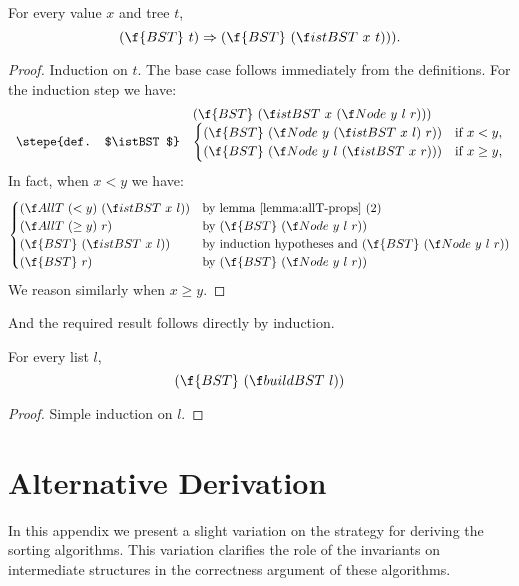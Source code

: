 \documentclass[a4paper,11pt]{llncs}
\begin{document}
\begin{proposition}
For every value $x$ and tree $t$,
\[ (\f{BST}\ t) \Rightarrow (\f{BST}\ (\istBST\ x\ t))). \]
\end{proposition}
\begin{proof}
  Induction on $t$. The base case follows immediately from the
  definitions. For the induction step we have:
\[
  \begin{array}{rl}
    & (\f{BST}\ (\istBST\ x\ (\Node\ y\ l\ r))) \\
    \stepe{def. $\istBST$}
    & 
    \begin{cases}
      (\f{BST}\ (\Node\ y\ (\istBST\ x\ l)\ r))
      & \text{if $x<y$,}\\
      (\f{BST}\ (\Node\ y\ l\ (\istBST\ x\ r)))
      & \text{if $x\geq y$,}\\
    \end{cases} \end{array}
\]
\noindent In fact, when $x<y$ we have:
\[
\begin{cases}
  (\AllT\ (<y)\ (\istBST\ x\ l))
  &\text{by lemma \ref{lemma:allT-props} (2)} \\
  (\AllT\ (\geq y)\ r)
  &\text{by $(\f{BST}\ (\Node\ y\ l\ r))$} \\
  (\f{BST}\ (\istBST\ x\ l))
  &\text{by induction hypotheses and $(\f{BST}\ (\Node\ y\ l\ r))$} \\
  (\f{BST}\ r)
  &\text{by $(\f{BST}\ (\Node\ y\ l\ r))$}
\end{cases}
\]
\noindent We reason similarly when $x\geq y$.
\end{proof}

And the required result follows directly by induction.

\begin{corollary}
\label{prop:buildbst}
For every list $l$,
\[ (\f{BST}\ (\buildBST\ l)) \]
\end{corollary}
\begin{proof}
  Simple induction on $l$.
\end{proof}

\newpage

\section{Alternative Derivation}
\label{app:sec:altern-deriv}

In this appendix we present a slight variation on the strategy for
deriving the sorting algorithms. This variation clarifies the role of
the invariants on intermediate structures in the correctness argument
of these algorithms.
\end{document}
